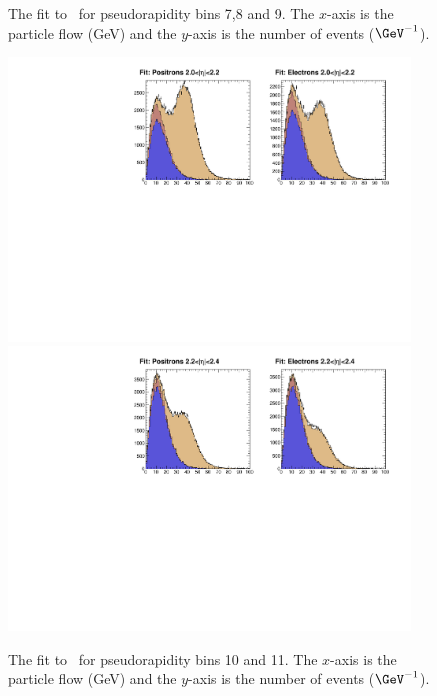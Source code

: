 \begin{figure}
\begin{center}
\caption{  \label{fig:data3} The fit to \MET\ for pseudorapidity bins 7,8 and
9.  The $x$-axis is the particle flow \ETm (GeV) and the $y$-axis is the number
of events ($\GeV^{-1}$).}
\end{center}
\end{figure}

\begin{figure}
\begin{center}
\includegraphics[width=0.95\textwidth]{data_9.pdf} \\
\includegraphics[width=0.95\textwidth]{data_10.pdf}
\caption{  \label{fig:data4} The fit to \MET\ for pseudorapidity bins 10 and
11.  The $x$-axis is the particle flow \ETm (GeV) and the $y$-axis is the number
of events ($\GeV^{-1}$).}
\end{center}
\end{figure}

